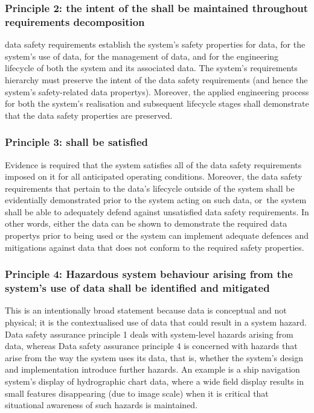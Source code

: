 \subsubsection{Principle 2: the intent of the  shall be maintained throughout requirements decomposition}
\Glspl{data safety requirement} establish the system's safety properties for data, for the system's use of data, for the management of data, and for the engineering lifecycle of both the system and its associated data. The system's requirements hierarchy must preserve the intent of the \glspl{data safety requirement} (and hence the system's safety-related \glspl{data property}). Moreover, the applied engineering process for both the system's realisation and subsequent lifecycle stages shall demonstrate that the data safety properties are preserved.

\subsubsection{Principle 3:  shall be satisfied}
Evidence is required that the system satisfies all of the \glspl{data safety requirement} imposed on it for all anticipated operating conditions. Moreover, the \glspl{data safety requirement} that pertain to the data's lifecycle outside of the system shall be evidentially demonstrated prior to the system acting on such data, \cbstart or\cbend\ the system shall be able to adequately defend against unsatisfied \glspl{data safety requirement}. In other words, either the data can be shown to demonstrate the required \glspl{data property} prior to being used or the system can implement adequate defences and mitigations against data that does not conform to the required safety properties.

\subsubsection{Principle 4: Hazardous system behaviour arising from the system's use of data shall be identified and mitigated}
This is an intentionally broad statement because data is conceptual and not physical; it is the contextualised use of data that could result in a system hazard. Data safety assurance principle 1 deals with system-level hazards arising from data, whereas Data safety assurance principle 4 is concerned with hazards that arise from the way the system uses its data, that is, whether the system's design and implementation introduce further hazards. An example is a ship navigation system's display of hydrographic chart data, where a wide field display results in small features disappearing (due to image scale) when it is critical that situational awareness of such hazards is maintained.

